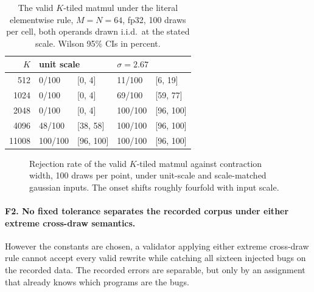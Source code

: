 \documentclass[twocolumn,10pt]{article}
\begin{document}
\begin{table}[t]
\centering
\begin{tabular}{@{}rllll@{}}
\toprule
$K$ & \multicolumn{2}{l}{unit scale} & \multicolumn{2}{l}{$\sigma=2.67$} \\
\midrule
512   & 0/100   & [0, 4]    & 11/100  & [6, 19] \\
1024  & 0/100   & [0, 4]    & 69/100  & [59, 77] \\
2048  & 0/100   & [0, 4]    & 100/100 & [96, 100] \\
4096  & 48/100  & [38, 58]  & 100/100 & [96, 100] \\
11008 & 100/100 & [96, 100] & 100/100 & [96, 100] \\
\bottomrule
\end{tabular}
\caption{The valid $K$-tiled matmul under the literal elementwise rule,
$M{=}N{=}64$, fp32, 100 draws per cell, both operands drawn i.i.d.\ at
the stated scale. Wilson 95\% CIs in percent.}
\label{tab:ksweep}
\end{table}

\begin{figure}[t]
\centering
{}
\caption{Rejection rate of the valid $K$-tiled matmul against contraction
width, 100 draws per point, under unit-scale and scale-matched gaussian
inputs. The onset shifts roughly fourfold with input scale.}
\label{fig:kscale}
\end{figure}

\paragraph{F2. No fixed tolerance separates the recorded corpus under
either extreme cross-draw semantics.} However the constants are chosen,
a validator applying either extreme cross-draw rule cannot accept every
valid rewrite while catching all sixteen injected bugs on the recorded
data. The recorded errors are separable, but only by an assignment that
already knows which programs are the bugs.
\end{document}
